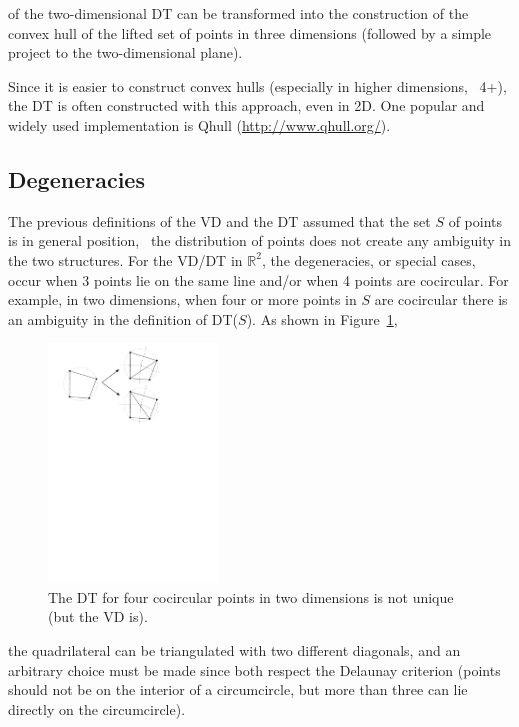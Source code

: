 %

 of the two-dimensional DT can be transformed into the construction of the convex hull of the lifted set of points in three dimensions (followed by a simple project to the two-dimensional plane).

\begin{myfloat}
  \begin{practice-box}
  Since it is easier to construct convex hulls (especially in higher dimensions, \ie\ 4+), the DT is often constructed with this approach, even in 2D. One popular and widely used implementation is Qhull (\url{http://www.qhull.org/}).
  \end{practice-box}
\end{myfloat}





%
\subsection{Degeneracies}
\label{sec:degeneracies}

The previous definitions of the VD and the DT assumed that the set $S$ of points is in general position, \ie\ the distribution of points does not create any ambiguity in the two structures. 
For the VD/DT in $\mathbb{R}^{2}$, the degeneracies, or special cases, occur when 3 points lie on the same line and/or when 4 points are cocircular. 
For example, in two dimensions, when four or more points in $S$ are cocircular there is an ambiguity in the definition of DT($S$). 
As shown in Figure~\ref{fig:degeneracies},
\begin{figure}
  \centering
  \includegraphics[width=0.4\textwidth]{figs/degeneracies}
  \caption{The DT for four cocircular points in two dimensions is not unique (but the VD is).}
\label{fig:degeneracies}
\end{figure}
the quadrilateral can be triangulated with two different diagonals, and an arbitrary choice must be made since both respect the Delaunay criterion (points should not be on the interior of a circumcircle, but more than three can lie directly on the circumcircle).

